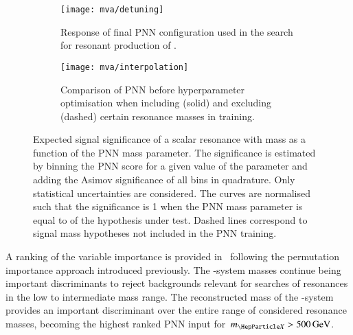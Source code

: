 \begin{figure}[htbp]
  \centering

  \begin{subfigure}[t]{.49\textwidth}
    \texttt{[image: mva/detuning]}
    \caption{Response of final PNN configuration used in the search
      for resonant production of \HH.}
    \label{fig:pnn_detuning}
  \end{subfigure}\hfill%
  \begin{subfigure}[t]{.49\textwidth}
    \centering
    \texttt{[image: mva/interpolation]}
    \caption{Comparison of PNN before hyperparameter optimisation when
      including (solid) and excluding (dashed) certain resonance
      masses in training.}
    \label{fig:pnn_interpolation}
  \end{subfigure}

  \caption[Expected signal significance as a function of the PNN mass
  parameter.]{Expected signal significance of a scalar resonance with mass \mX
    as a function of the PNN mass parameter. The significance is estimated by
    binning the PNN score for a given value of the parameter and adding the
    Asimov significance of all bins in quadrature. Only statistical
    uncertainties are considered. The curves are normalised such that the
    significance is 1 when the PNN mass parameter is equal to \mX of the
    hypothesis under test. Dashed lines correspond to signal mass hypotheses not
    included in the PNN training.}
  \label{fig:pnn_properties}
\end{figure}

A ranking of the variable importance is provided
in~ following the permutation importance
approach introduced previously. The \PHiggs-system masses continue
being important discriminants to reject backgrounds relevant for
searches of resonances in the low to intermediate mass range. The
reconstructed mass of the \HH-system provides an important
discriminant over the entire range of considered resonance masses,
becoming the highest ranked PNN input for~$\mX > \SI{500}{\GeV}$.

